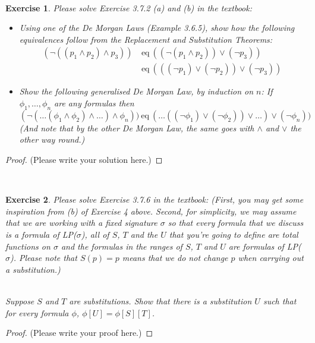 \documentclass[12pt,a4paper]{article}
\theoremstyle{plain}
\newtheorem{exercise}{Exercise}
\begin{document}
\ \\
\begin{exercise}
Please solve Exercise 3.7.2 (a) and (b) in the textbook:

\begin{itemize}

\item[(a)] Using one of the De Morgan Laws (Example 3.6.5), show how the following equivalences follow from the Replacement and Substitution Theorems:
%
\begin{align*}
( \neg ( ( p_1 \wedge p_2 ) \wedge p_3 ) ) \ &\text{eq} \ (( \neg ( p_1 \wedge p_2)) \vee (\neg p_3)) \\
&\text{eq}\ ((( \neg p_1) \vee ( \neg p_2)) \vee ( \neg p_3))
\end{align*}

\item[(b)] Show the following generalised De Morgan Law, by induction on $n$:
If $\phi_1 , \dots , \phi_n$ are any formulas then
%
\[
( \neg ( \dots ( \phi_1 \wedge \phi_2 ) \wedge \dots ) \wedge \phi_n )) \ \text{eq} \ ( \dots (( \neg \phi_1 ) \vee ( \neg \phi_2 ) ) \vee \dots ) \vee ( \neg \phi_n ))
\]
%
(And note that by the other De Morgan Law, the same goes with
$\wedge$ and $\vee$ the other way round.)

\end{itemize}
\end{exercise}

\begin{proof}
(Please write your solution here.)
\end{proof}

\ \\
\begin{exercise}
Please solve Exercise 3.7.6 in the textbook: (First, you may get some inspiration from (b) of Exercise 4 above.
Second, for simplicity, we may assume that we are working with a fixed signature $\sigma$ so that every formula that we discuss is a formula of LP($\sigma$), all of $S$, $T$ and the $U$ that you're going to define are \emph{total} functions on $\sigma$ and the formulas in the ranges of $S$, $T$ and $U$ are formulas of LP($\sigma$).
Please note that $S (p) = p$ means that we do not change $p$ when carrying out a substitution.)

\ \\
Suppose $S$ and $T$ are substitutions. 
Show that there is a substitution $U$ such that for every formula $\phi$, $\phi [U] = \phi [S] [T]$.
\end{exercise}

\begin{proof}
(Please write your proof here.)
\end{proof}

\end{document}

